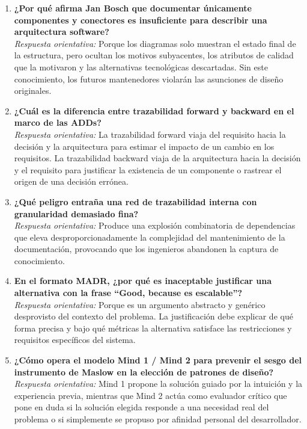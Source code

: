 \begin{enumerate}[leftmargin=1.8em]
  \item \textbf{¿Por qué afirma Jan Bosch que documentar únicamente componentes y conectores es insuficiente para describir una arquitectura software?} \\
  \emph{Respuesta orientativa:} Porque los diagramas solo muestran el estado final de la estructura, pero ocultan los motivos subyacentes, los atributos de calidad que la motivaron y las alternativas tecnológicas descartadas. Sin este conocimiento, los futuros mantenedores violarán las asunciones de diseño originales.

  \item \textbf{¿Cuál es la diferencia entre trazabilidad forward y backward en el marco de las ADDs?} \\
  \emph{Respuesta orientativa:} La trazabilidad forward viaja del requisito hacia la decisión y la arquitectura para estimar el impacto de un cambio en los requisitos. La trazabilidad backward viaja de la arquitectura hacia la decisión y el requisito para justificar la existencia de un componente o rastrear el origen de una decisión errónea.

  \item \textbf{¿Qué peligro entraña una red de trazabilidad interna con granularidad demasiado fina?} \\
  \emph{Respuesta orientativa:} Produce una explosión combinatoria de dependencias que eleva desproporcionadamente la complejidad del mantenimiento de la documentación, provocando que los ingenieros abandonen la captura de conocimiento.

  \item \textbf{En el formato MADR, ¿por qué es inaceptable justificar una alternativa con la frase ``Good, because es escalable''?} \\
  \emph{Respuesta orientativa:} Porque es un argumento abstracto y genérico desprovisto del contexto del problema. La justificación debe explicar de qué forma precisa y bajo qué métricas la alternativa satisface las restricciones y requisitos específicos del sistema.

  \item \textbf{¿Cómo opera el modelo Mind 1 / Mind 2 para prevenir el sesgo del instrumento de Maslow en la elección de patrones de diseño?} \\
  \emph{Respuesta orientativa:} Mind 1 propone la solución guiado por la intuición y la experiencia previa, mientras que Mind 2 actúa como evaluador crítico que pone en duda si la solución elegida responde a una necesidad real del problema o si simplemente se propuso por afinidad personal del desarrollador.
\end{enumerate}
